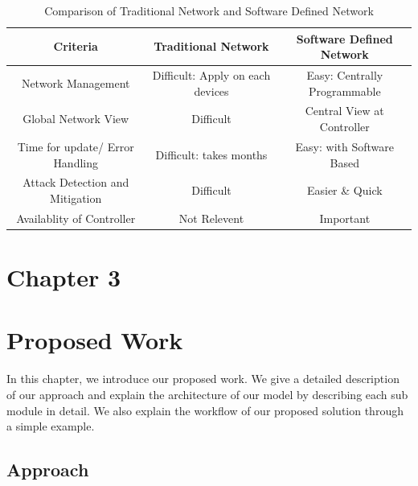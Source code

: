 \documentclass[12pt,letterpaper]{article}
\begin{document}
        \begin{table}[ht]
            \centering
            \caption{Comparison of Traditional Network and Software Defined Network}
            \label{tab:network-comparison}
            \begin{tabular}{ccc}
            \toprule
            \textbf{Criteria} & \textbf{Traditional Network} & \textbf{Software Defined Network} \\
            \midrule
                Network Management & Difficult: Apply on each devices & Easy: Centrally Programmable \\
                Global Network View & Difficult & Central View at Controller \\
                Time for update/ Error Handling & Difficult: takes months & Easy: with Software Based \\
                Attack Detection and Mitigation & Difficult & Easier \& Quick \\
                Availablity of Controller & Not Relevent & Important \\
            \bottomrule
            \end{tabular}
        \end{table}
\clearpage    
    \newpage
    \section*{Chapter 3}
        \section{Proposed Work}
        In this chapter, we introduce our proposed work. We give a detailed description of our approach and explain the architecture of our model by describing each sub module in detail. We also explain the workflow of our proposed solution through a simple example.

        \subsection{Approach}
\end{document}
